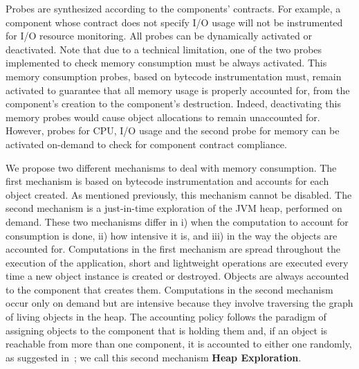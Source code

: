 Probes are synthesized according to the components' contracts.
For example, a component whose contract does not specify I/O usage will not be instrumented for I/O resource monitoring.
All probes can be dynamically activated or deactivated.
Note that due to a technical limitation, one of the two probes implemented to check memory consumption must be always activated.  
This memory consumption probes, based on bytecode instrumentation must, remain activated to guarantee that all memory usage is properly accounted for, from the component's creation to the component's destruction.
Indeed, deactivating this memory probes would cause object allocations to remain unaccounted for.
However, probes for CPU, I/O usage and the second probe for memory can be activated on-demand to check for component contract compliance.

We propose two different mechanisms to deal with memory consumption.
The first mechanism is based on bytecode instrumentation and accounts for each object created. 
As mentioned previously, this mechanism cannot be disabled.
The second mechanism is a just-in-time exploration of the JVM heap, performed on demand.
These two mechanisms differ in i) when the computation to account for consumption is done, ii) how intensive it is, and iii) in the way the objects are accounted for.
Computations in the first mechanism are spread throughout the execution of the application, short and lightweight operations are executed every time a new object instance is created or destroyed.
Objects are always accounted to the component that creates them.
Computations in the second mechanism occur only on demand but are intensive because they involve traversing the graph of living objects in the heap.
The accounting policy follows the paradigm of assigning objects to the component that is holding them and, if an object is reachable from more than one component, it is accounted to either one randomly, as suggested in~\cite{Price:2003:GCM:829515.830545,dsn/09/geoffray/ijvm}; we call this second mechanism \textbf{Heap Exploration}.


